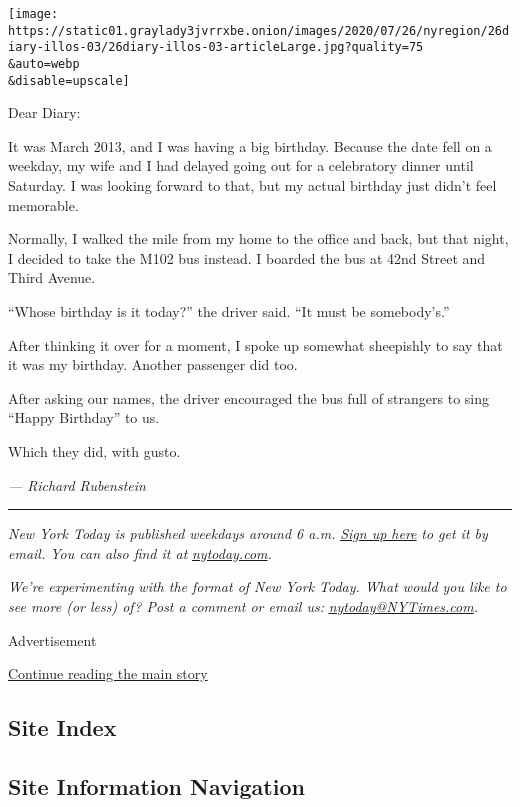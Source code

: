 \texttt{[image: https://static01.graylady3jvrrxbe.onion/images/2020/07/26/nyregion/26diary-illos-03/26diary-illos-03-articleLarge.jpg?quality=75\\\&auto=webp\\\&disable=upscale]}

Dear Diary:

It was March 2013, and I was having a big birthday. Because the date
fell on a weekday, my wife and I had delayed going out for a celebratory
dinner until Saturday. I was looking forward to that, but my actual
birthday just didn't feel memorable.

Normally, I walked the mile from my home to the office and back, but
that night, I decided to take the M102 bus instead. I boarded the bus at
42nd Street and Third Avenue.

``Whose birthday is it today?'' the driver said. ``It must be
somebody's.''

After thinking it over for a moment, I spoke up somewhat sheepishly to
say that it was my birthday. Another passenger did too.

After asking our names, the driver encouraged the bus full of strangers
to sing ``Happy Birthday'' to us.

Which they did, with gusto.

\emph{--- Richard Rubenstein}

\begin{center}\rule{0.5\linewidth}{\linethickness}\end{center}

\emph{New York Today is published weekdays around 6 a.m.}
\href{https://www.nytimes3xbfgragh.onion/newsletters/newyorktoday?module=inline}{\emph{Sign
up here}} \emph{to get it by email. You can also find it at}
\href{http://www.nytoday.com/}{\emph{nytoday.com}}\emph{.}

\emph{We're experimenting with the format of New York Today. What would
you like to see more (or less) of? Post a comment or email us:}
\href{mailto:nytoday@NYTimes.com}{\emph{nytoday@NYTimes.com}}\emph{.}

Advertisement

\protect\hyperlink{after-bottom}{Continue reading the main story}

\hypertarget{site-index}{%
\subsection{Site Index}\label{site-index}}

\hypertarget{site-information-navigation}{%
\subsection{Site Information
Navigation}\label{site-information-navigation}}

